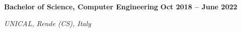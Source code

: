 \documentclass[10pt, a4paper]{article}
\newcommand{\cvsubsection}[3]{%
  \par %
  {\large\bfseries #1} %
  \hfill %
  {\bfseries #2} %
  \par %
  {\textit{#3}} %
  \vspace{4pt} %
}
\begin{document}
\begin{minipage}[t]{0.68\textwidth}
\vspace{6pt} %
\cvsubsection
  {Bachelor of Science, Computer Engineering} %
  {Oct 2018 -- June 2022} %
  {UNICAL, Rende (CS), Italy} %
  

\end{minipage}
\hfill %
\end{document}
